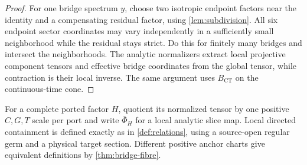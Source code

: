 \begin{proof}
For one bridge spectrum \(y\), choose two isotropic endpoint factors near the
identity and a compensating residual factor, using
\cref{lem:subdivision}.  All six endpoint sector coordinates may vary
independently in a sufficiently small neighborhood while the residual stays
strict.  Do this for finitely many bridges and intersect the neighborhoods.
The analytic normalizers extract local projective component tensors and
effective bridge coordinates from the global tensor, while contraction is
their local inverse.  The same argument uses \(B_{\mathrm{CT}}\) on the
continuous-time cone.
\end{proof}

For a complete ported factor \(H\), quotient its normalized tensor by one
positive \(C,G,T\) scale per port and write \(\overline\Phi_H\) for a local
analytic slice map.  Local directed containment is defined exactly as in
\cref{def:relations}, using a source-open regular germ and a physical target
section.  Different positive anchor charts give equivalent definitions by
\cref{thm:bridge-fibre}.
